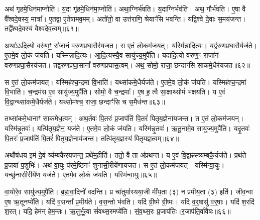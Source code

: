 अथ॑ गृहमे॒धिन॑माप्नोति।
य॒दा गृ॑हमे॒धिन॑मा॒प्नोति॑।
अथा॒ग्निर्भ॑वति।
य॒दाग्निर्भव॑ति।
अथ॒ गौर्भ॑वति।
ए॒षा वै वै᳚श्वदे॒वस्य॒ मात्रा᳚।
ए॒तद्वा ए॒तेषा॑मव॒मम्।
अतो॑तो॒ वा उत्त॑राणि॒ श्रेयाꣳ॑सि भवन्ति।
यद्विश्वे॑ दे॒वाः स॒मय॑जन्त।
तद्वै᳚श्वदे॒वस्य॑ वैश्वदेव॒त्वम्॥६१॥\ip

अथा॑ऽऽदि॒त्यो वरु॑ण॒ꣳ॒ रा॑जानं वरुणप्रघा॒सैर॑यजत।
स ए॒तं लो॒कम॑जयत्।
यस्मि॑न्नादि॒त्यः।
यद्व॑रुणप्रघा॒सैर्यज॑ते।
ए॒तमे॒व लो॒कं ज॑यति।
यस्मि॑न्नादि॒त्यः।
आ॒दि॒त्यस्यै॒व सायु॑ज्य॒मुपै॑ति।
यदा॑दि॒त्यो वरु॑ण॒ꣳ॒ राजा॑नं वरुणप्रघा॒सै\-रय॑जत।
तद्व॑रुणप्रघा॒सानां᳚ वरुणप्रघास॒त्वम्।
अथ॒ सोमो॒ राजा॒ छन्दाꣳ॑सि साकमे॒धैर॑यजत॥६२॥\ip

स ए॒तं लो॒कम॑जयत्।
यस्मिꣴ॑श्च॒न्द्रमा॑ वि॒भाति॑।
यथ्सा॑कमे॒धैर्यज॑ते।
ए॒तमे॒व लो॒कं ज॑यति।
यस्मिꣴ॑श्च॒न्द्रमा॑ वि॒भाति॑।
च॒न्द्रम॑स ए॒व सायु॑ज्य॒मुपै॑ति।
सोमो॒ वै च॒न्द्रमाः᳚।
ए॒ष ह॒ त्वै सा॒क्षाथ्सोमं॑ भक्षयति।
य ए॒वं वि॒द्वान्थ्सा॑कमे॒धैर्यज॑ते।
यथ्सोम॑श्च॒ राजा॒ छन्दाꣳ॑सि च स॒मैध॑न्त॥६३॥\ip

तथ्सा॑कमे॒धानाꣳ॑ साकमेध॒त्वम्।
अथ॒र्तवः॑ पि॒तरः॑ प्र॒जा\-प॑तिं पि॒तरं॑ पितृय॒ज्ञेना॑यजन्त।
त ए॒तं लो॒कम॑जयन्।
यस्मि॑न्नृ॒तवः॑।
यत्पि॑तृय॒ज्ञेन॒ यज॑ते।
ए॒तमे॒व लो॒कं ज॑यति।
यस्मि॑न्नृ॒तवः॑।
ऋ॒तू॒नामे॒व सायु॑ज्य॒मुपै॑ति।
यदृ॒तवः॑ पि॒तरः॑ प्र॒जा\-प॑तिं पि॒तरं॑ पितृय॒ज्ञेनाय॑जन्त।
तत्पि॑तृय॒ज्ञस्य॑ पितृयज्ञ॒त्वम्॥६४॥\ip

अथौष॑धय इ॒मं दे॒वं त्र्य॑म्बकैरयजन्त॒ प्रथे॑म॒हीति॑।
ततो॒ वै ता अ॑प्रथन्त।
य ए॒वं वि॒द्वाꣴस्त्र्य॑म्बकै॒र्यज॑ते।
प्रथ॑ते प्र॒जया॑ प॒शुभिः॑।
अथ॑ वा॒युः प॑रमे॒ष्ठिनꣳ॑ शुनासी॒रीये॑णायजत।
स ए॒तं लो॒कम॑जयत्।
यस्मि॑न्वा॒युः।
यच्छु॑नासी॒रीये॑ण॒ यज॑ते।
ए॒तमे॒व लो॒कं ज॑यति।
यस्मि॑न्वा॒युः॥६५॥\ip

वा॒योरे॒व सायु॑ज्य॒मुपै॑ति।
ब्र॒ह्म॒वा॒दिनो॑ वदन्ति।
प्र चा॑तुर्मास्यया॒जी मी॑य॒ता (३) न प्रमी॑य॒ता (३) इति॑।
जीव॒न्वा ए॒ष ऋ॒तूनप्ये॑ति।
यदि॑ व॒सन्ता᳚ प्र॒मीय॑ते।
व॒स॒न्तो भ॑वति।
यदि॑ ग्री॒ष्मे ग्री॒ष्मः।
यदि॑ व॒र्॒षासु॑ व॒र्॒षाः।
यदि॑ श॒रदि॑ श॒रत्।
यदि॒ हेम॑न् हेम॒न्तः।
ऋ॒तुर्भू॒त्वा सं॑वथ्स॒रमप्ये॑ति।
सं॒व॒थ्स॒रः प्र॒जा\-प॑तिः।र॒जा\-प॑ति॒र्वावैषः॥६६॥\ip{}


\clearpage
{}
\setcounter{anuvakam}{0}

